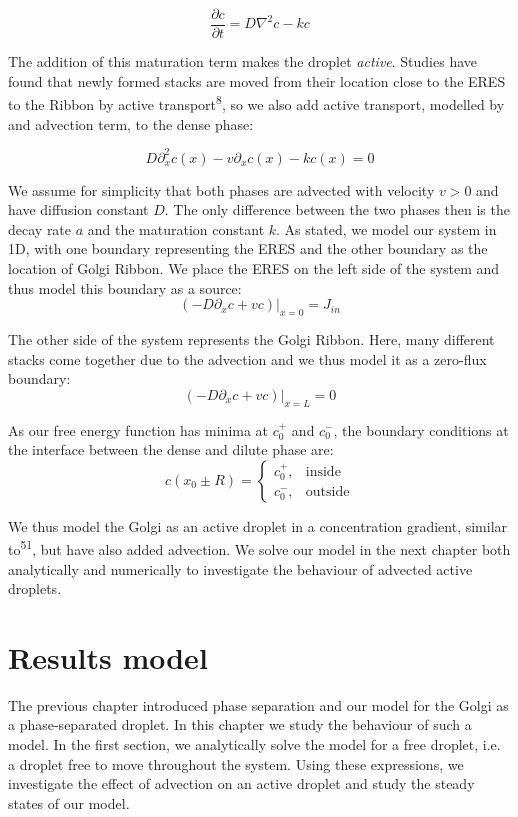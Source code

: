 \documentclass{Dissertate}
\begin{document}
\[
\frac{\partial c}{\partial t} = D\nabla^2 c - kc
\]

The addition of this maturation term makes the droplet \emph{active}. Studies have found that newly formed stacks are moved from their location close to the ERES to the Ribbon by active transport\textsuperscript{8}, so we also add active transport, modelled by and advection term, to the dense phase:

\begin{equation}
D\partial_x^2 c(x) - v\partial_xc(x)-kc(x)=0
\label{eq:coutside}
\end{equation}

We assume for simplicity that both phases are advected with velocity $v>0$ and have diffusion constant $D$. The only difference between the two phases then is the decay rate $a$ and the maturation constant $k$. As stated, we model our system in 1D, with one boundary representing the
ERES and the other boundary as the location of Golgi Ribbon. We place
the ERES on the left side of the system and thus model this boundary as a
source: \[
(-D\partial_xc+vc)|_{x=0} = J_{in}
\]

The other side of the system represents the Golgi Ribbon. Here, many different stacks come together due to the advection and we thus model it as a zero-flux boundary: \[
(-D\partial_xc+vc)|_{x=L} = 0
\]

As our free energy function has minima at \(c_0^+\) and \(c_0^{-}\), the boundary conditions at the interface between the dense and dilute phase are: \[
c(x_0\pm R)=
\begin{cases}
    c_0^+,& \text{inside}\\
    c_0^-,& \text{outside}
\end{cases}
\]

We thus model the Golgi as an active droplet in a concentration gradient, similar to\textsuperscript{51}, but have also added advection. We solve our model in the next chapter both analytically and numerically to investigate the behaviour of advected active droplets. 


\hypertarget{results-model}{%
\chapter{Results model}\label{results-model}}

The previous chapter introduced phase separation and our model for the
Golgi as a phase-separated droplet. In this chapter we study the
behaviour of such a model. In the first section, we analytically solve the
model for a free droplet, i.e. a droplet free to move throughout the
system. Using these expressions, we investigate the effect of advection
on an active droplet and study the steady states of our model.
\end{document}
